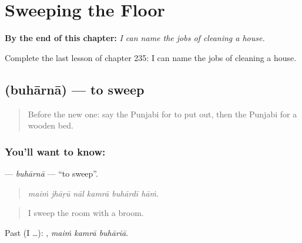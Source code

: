 
\chapter{Sweeping the Floor}
\label{ch:pa-a2-sweeping-the-floor}

\begin{chapteropening}
\textbf{By the end of this chapter:} \emph{I can name the jobs of cleaning a house.}

Complete the last lesson of chapter 235: I can name the jobs of cleaning a house.
\end{chapteropening}

\section[\texorpdfstring{\pa{ਬੁਹਾਰਨਾ} (buhārnā)}{ਬੁਹਾਰਨਾ (buhārnā)}]{ (buhārnā) — to sweep}

\label{lesson:PA-C235-buharna}



\begin{quote}
Before the new one: say the Punjabi for to put out, then the Punjabi for a wooden bed.
\end{quote}

\subsection*{You'll want to know: }
\textbf{} — \emph{buhārnā} — \textquotedblleft{}to sweep\textquotedblright{}.

\begin{quote}
     
\end{quote}

\begin{quote}
\emph{maiṁ jhāṛū nāl kamrā buhārdī hāṁ.}
\end{quote}

\begin{quote}
I sweep the room with a broom.
\end{quote}

Past (I …):   , \emph{maiṁ kamrā buhāriā}.

